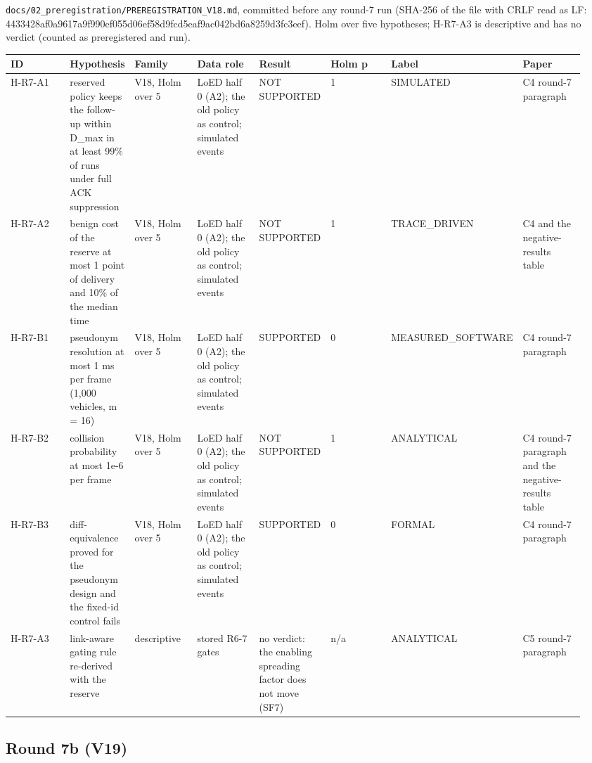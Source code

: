\texttt{docs/02\_preregistration/PREREGISTRATION\_V18.md}, committed before any round-7 run (SHA-256 of the file with CRLF read as LF: 4433428af0a9617a9f990ef055d06ef58d9fcd5eaf9ac042bd6a8259d3fc3eef). Holm over five hypotheses; H-R7-A3 is descriptive and has no verdict (counted as preregistered and run).

{\scriptsize\raggedright
\begin{longtable}{p{0.119\linewidth}p{0.119\linewidth}p{0.119\linewidth}p{0.119\linewidth}p{0.119\linewidth}p{0.119\linewidth}p{0.119\linewidth}p{0.119\linewidth}}
\toprule
ID & Hypothesis & Family & Data role & Result & Holm p & Label & Paper \\
\midrule
\endhead
H-R7-A1 & reserved policy keeps the follow-up within D\_max in at least 99\% of runs under full ACK suppression & V18, Holm over 5 & LoED half 0 (A2); the old policy as control; simulated events & NOT SUPPORTED & 1 & SIMULATED & C4 round-7 paragraph \\
H-R7-A2 & benign cost of the reserve at most 1 point of delivery and 10\% of the median time & V18, Holm over 5 & LoED half 0 (A2); the old policy as control; simulated events & NOT SUPPORTED & 1 & TRACE\_DRIVEN & C4 and the negative-results table \\
H-R7-B1 & pseudonym resolution at most 1 ms per frame (1,000 vehicles, m = 16) & V18, Holm over 5 & LoED half 0 (A2); the old policy as control; simulated events & SUPPORTED & 0 & MEASURED\_SOFTWARE & C4 round-7 paragraph \\
H-R7-B2 & collision probability at most 1e-6 per frame & V18, Holm over 5 & LoED half 0 (A2); the old policy as control; simulated events & NOT SUPPORTED & 1 & ANALYTICAL & C4 round-7 paragraph and the negative-results table \\
H-R7-B3 & diff-equivalence proved for the pseudonym design and the fixed-id control fails & V18, Holm over 5 & LoED half 0 (A2); the old policy as control; simulated events & SUPPORTED & 0 & FORMAL & C4 round-7 paragraph \\
H-R7-A3 & link-aware gating rule re-derived with the reserve & descriptive & stored R6-7 gates & no verdict: the enabling spreading factor does not move (SF7) & n/a & ANALYTICAL & C5 round-7 paragraph \\
\bottomrule
\end{longtable}}


\subsection*{Round 7b (V19)}

